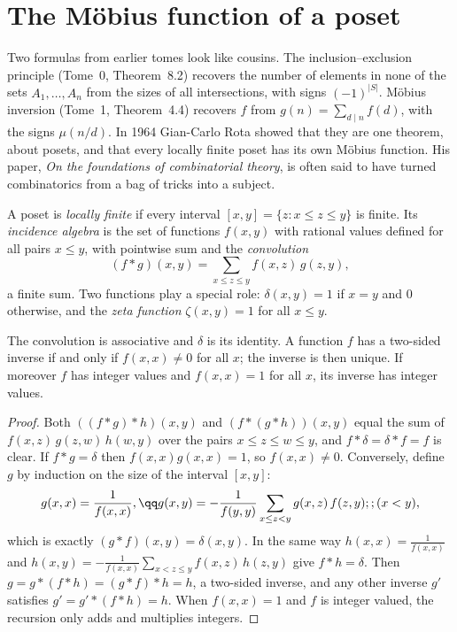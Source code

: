 \section{The M\"obius function of a poset}

Two formulas from earlier tomes look like cousins. The inclusion--exclusion principle (Tome~0, Theorem~8.2) recovers the
number of elements in none of the sets $A_1,\dots,A_n$ from the sizes of all intersections, with signs $(-1)^{|S|}$. M\"obius
inversion (Tome~1, Theorem~4.4) recovers $f$ from $g(n)=\sum_{d\mid n}f(d)$, with the signs $\mu(n/d)$. In 1964 Gian-Carlo Rota
showed that they are one theorem, about posets, and that every locally finite poset has its own M\"obius function. His paper,
\emph{On the foundations of combinatorial theory}, is often said to have turned combinatorics from a bag of tricks into a
subject.

A poset is \emph{locally finite} if every interval $[x,y]=\{z:x\le z\le y\}$ is finite. Its \emph{incidence algebra} is the set of functions
$f(x,y)$ with rational values defined for all pairs $x\le y$, with pointwise sum and the \emph{convolution}
\[
(f*g)(x,y)=\sum_{x\le z\le y}f(x,z)\,g(z,y),
\]
a finite sum. Two functions play a special role: $\delta(x,y)=1$ if $x=y$ and $0$ otherwise, and the \emph{zeta function} $\zeta(x,y)=1$
for all $x\le y$.

\begin{proposition}\label{prop:incidence}
The convolution is associative and $\delta$ is its identity. A function $f$ has a two-sided inverse if and only if $f(x,x)\ne0$
for all $x$; the inverse is then unique. If moreover $f$ has integer values and $f(x,x)=1$ for all $x$, its inverse has integer
values.
\end{proposition}
\begin{proof}
Both $((f*g)*h)(x,y)$ and $(f*(g*h))(x,y)$ equal the sum of $f(x,z)\,g(z,w)\,h(w,y)$ over the pairs $x\le z\le w\le y$, and $f*\delta=\delta*f=f$
is clear. If $f*g=\delta$ then $f(x,x)g(x,x)=1$, so $f(x,x)\neq0$. Conversely, define $g$ by induction on the size of the interval $[x,y]$:
\[
\begin{gathered}g(x,x)=\frac1{f(x,x)},\qq g(x,y)=-\frac1{f(y,y)}\sum_{x\le z<y}g(x,z)\,f(z,y);;(x<y),\end{gathered}
\]
which is exactly $(g*f)(x,y)=\delta(x,y)$. In the same way $h(x,x)=\frac1{f(x,x)}$ and $h(x,y)=-\frac1{f(x,x)}\sum_{x<z\le y}f(x,z)\,h(z,y)$ give
$f*h=\delta$. Then $g=g*(f*h)=(g*f)*h=h$, a two-sided inverse, and any other inverse $g'$ satisfies $g'=g'*(f*h)=h$. When
$f(x,x)=1$ and $f$ is integer valued, the recursion only adds and multiplies integers.
\end{proof}

